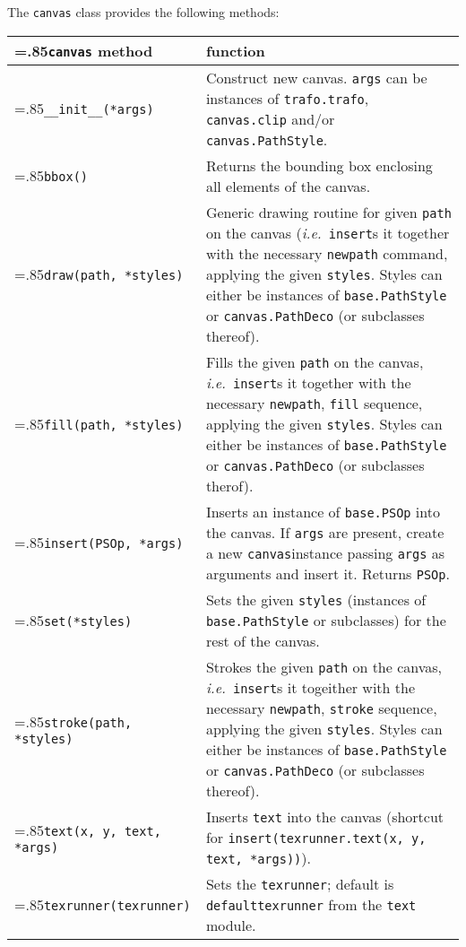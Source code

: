 The \verb|canvas| class provides the following methods:

\medskip
\begin{tabularx}
  {\linewidth}
  {>{\hsize=.85\hsize}X>{\raggedright\arraybackslash\hsize=1.15\hsize}X}
  \texttt{canvas} method & function \\
  \hline
  \texttt{\_\_init\_\_(*args)} & Construct new canvas. \texttt{args}
  can be instances of \texttt{trafo.trafo}, \texttt{canvas.clip}
  and/or \texttt{canvas.PathStyle}.\\
  \texttt{bbox()} &
  Returns the bounding box enclosing all elements of the canvas.\\
  \texttt{draw(path, *styles)} &
  Generic drawing routine for given \texttt{path} on the canvas (\textit{i.e.}\
  \texttt{insert}s it together with the necessary \texttt{newpath}
  command, applying the given \texttt{styles}. Styles can either be instances of
  \texttt{base.PathStyle} or \texttt{canvas.PathDeco} (or subclasses thereof).\\
  \texttt{fill(path, *styles)} &
  Fills the given \texttt{path} on the canvas, \textit{i.e.}\
  \texttt{insert}s it together with the necessary \texttt{newpath},
  \texttt{fill} sequence, applying the given \texttt{styles}. Styles can
  either be instances of \texttt{base.PathStyle} or
  \texttt{canvas.PathDeco} (or subclasses
  therof).\\
  \texttt{insert(PSOp, *args)} &
  Inserts an instance of \texttt{base.PSOp} into the canvas.
  If \texttt{args} are present, create a new \texttt{canvas}instance passing
  \texttt{args} as arguments and insert it. Returns \texttt{PSOp}.\\
  \texttt{set(*styles)} &
  Sets the given \texttt{styles} (instances of \texttt{base.PathStyle} or
  subclasses) for the rest of the canvas.\\
  \texttt{stroke(path, *styles)} & 
  Strokes the given \texttt{path} on the canvas, \textit{i.e.}\
  \texttt{insert}s it togeither with the necessary \texttt{newpath},
  \texttt{stroke} sequence, applying the given \texttt{styles}. Styles
  can either be instances of \texttt{base.PathStyle} or
  \texttt{canvas.PathDeco}
  (or subclasses thereof).\\
  \texttt{text(x, y, text, *args)} &
  Inserts \texttt{text} into the
  canvas (shortcut for
  \texttt{insert(texrunner.text(x, y, text, *args))}).\\
  \texttt{texrunner(texrunner)} &
  Sets the \texttt{texrunner}; default is \texttt{defaulttexrunner}
  from the \texttt{text} module.\\

\end{tabularx}
